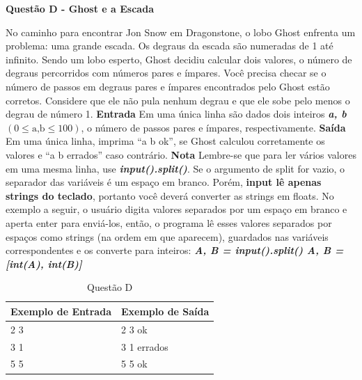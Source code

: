 \documentclass[a4paper, 12pt]{article}
\begin{document}
\newpage %
\begin{center}
\textbf{{\Large Questão D - Ghost e a Escada}}
\end{center}
\vspace{5pt}
No caminho para encontrar Jon Snow em Dragonstone, o lobo Ghost enfrenta um problema: uma grande escada. Os degraus da escada são numeradas de 1 até infinito. Sendo um lobo esperto, Ghost decidiu calcular dois valores, o número de degraus percorridos com números pares e ímpares. \newline \newline
Você precisa checar se o número de passos em degraus pares e ímpares encontrados pelo Ghost estão corretos. Considere que ele não pula nenhum degrau e que ele sobe pelo menos o degrau de número 1. 
\newline \newline
\textbf{{\large Entrada}} \newline
Em uma única linha são dados dois inteiros \textit{\textbf{a, b}} $(0 \leq \textrm{a,b} \leq 100)$, o número de passos pares e ímpares, respectivamente. 
\newline \newline
\textbf{{\large Saída}} \newline
Em uma única linha, imprima ``a b ok'', se Ghost calculou corretamente os valores e ``a b errados'' caso contrário.
\newline \newline
\textbf{{\large Nota}} \newline
Lembre-se que para ler vários valores em uma mesma linha, use \textbf{\textit{input().split()}}. Se o argumento de split for vazio, o separador das variáveis é um espaço em branco. Porém, \textbf{input lê apenas strings do teclado}, portanto você deverá converter as strings em floats. No exemplo a seguir, o usuário digita valores separados por um espaço em branco e aperta enter para enviá-los, então, o programa lê esses valores separados por espaços como strings (na ordem em que aparecem), guardados nas variáveis correspondentes e os converte para inteiros: \newline
\textbf{\textit{A, B = input().split() \newline
A, B = [int(A), int(B)]}}
\newline
\begin{table}[H]
	\centering
	\begin{tabular}{|l|l|}
	\hline
	\textbf{Exemplo de Entrada} & \textbf{Exemplo de Saída} \\ \hline
	2 3 & 2 3 ok \\ \hline
	3 1 & 3 1 errados \\ \hline
	5 5 & 5 5 ok \\ \hline
	\end{tabular}
	\caption{Questão D}
	\label{tabela4}
\end{table}
\end{document}
